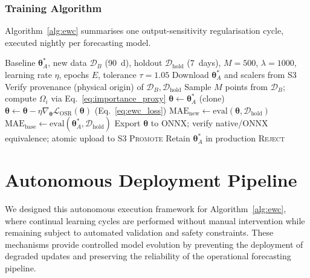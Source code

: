 \documentclass[journal]{IEEEtran}
\newcommand{\loss}{\mathcal{L}}
\newcommand{\params}{\bm{\theta}}
\newcommand{\ewclambda}{\lambda}
\begin{document}
\subsubsection{Training Algorithm}

Algorithm~\ref{alg:ewc} summarises one output-sensitivity regularisation
cycle, executed nightly per forecasting model.

\begin{algorithm}[t]
\caption{Output-Sensitivity Regularisation Cycle (per model, nightly)}
\label{alg:ewc}
\begin{algorithmic}[1]
\REQUIRE Baseline $\params_A^*$, new data $\mathcal{D}_B$ (90~d),
holdout $\mathcal{D}_{\mathrm{hold}}$ (7~days), $M{=}500$,
$\ewclambda{=}1000$, learning rate $\eta$, epochs $E$, tolerance $\tau{=}1.05$
\STATE Download $\params_A^*$ and scalers from S3
\STATE Verify provenance (physical origin) of
$\mathcal{D}_B,\mathcal{D}_{\mathrm{hold}}$
\STATE Sample $M$ points from $\mathcal{D}_B$; compute $\Omega_i$
via Eq.~\eqref{eq:importance_proxy}
\STATE $\params \leftarrow \params_A^*$ \hfill (clone)
        \STATE $\params \leftarrow \params - \eta \nabla_{\params}
        \loss_{\mathrm{OSR}}(\params)$ \hfill (Eq.~\eqref{eq:ewc_loss})
    \ENDFOR
\ENDFOR
\STATE $\mathrm{MAE}_{\mathrm{new}} \leftarrow \mathrm{eval}(\params, \mathcal{D}_{\mathrm{hold}})$
\STATE $\mathrm{MAE}_{\mathrm{base}} \leftarrow \mathrm{eval}(\params_A^*, \mathcal{D}_{\mathrm{hold}})$
    \STATE Export $\params$ to ONNX; verify native/ONNX equivalence;
    atomic upload to S3 \algorithmicreturn{} \textsc{Promote}
\ELSE
    \STATE Retain $\params_A^*$ in production \algorithmicreturn{} \textsc{Reject}
\ENDIF
\end{algorithmic}
\end{algorithm}

\section{Autonomous Deployment Pipeline}
\label{sec:deployment}

We designed this autonomous
execution framework for Algorithm~\ref{alg:ewc}, where continual learning
cycles are performed without manual intervention while remaining subject
to automated validation and safety constraints. These mechanisms provide
controlled model evolution by preventing the deployment of degraded
updates and preserving the reliability of the operational forecasting
pipeline.
\end{document}
